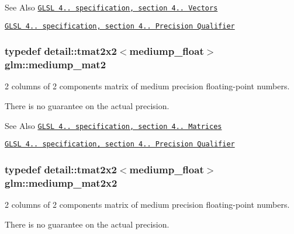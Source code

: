 \begin{DoxySeeAlso}{See Also}
\href{http://www.opengl.org/registry/doc/GLSLangSpec.4.20.8.pdf}{\tt G\-L\-S\-L 4.. specification, section 4.. Vectors} 

\href{http://www.opengl.org/registry/doc/GLSLangSpec.4.20.8.pdf}{\tt G\-L\-S\-L 4.. specification, section 4.. Precision Qualifier} 
\end{DoxySeeAlso}
\hypertarget{group__core__precision_gae67a4f24fb96b68e0f0346ef4212db61}{
\subsubsection[{mediump\-\_\-mat2}]{\setlength{\rightskip}{0pt plus 5cm}typedef detail\-::tmat2x2$<$mediump\-\_\-float$>$ {\bf glm\-::mediump\-\_\-mat2}}}\label{group__core__precision_gae67a4f24fb96b68e0f0346ef4212db61}


2 columns of 2 components matrix of medium precision floating-\/point numbers. 

There is no guarantee on the actual precision.

\begin{DoxySeeAlso}{See Also}
\href{http://www.opengl.org/registry/doc/GLSLangSpec.4.20.8.pdf}{\tt G\-L\-S\-L 4.. specification, section 4.. Matrices} 

\href{http://www.opengl.org/registry/doc/GLSLangSpec.4.20.8.pdf}{\tt G\-L\-S\-L 4.. specification, section 4.. Precision Qualifier} 
\end{DoxySeeAlso}
\hypertarget{group__core__precision_gaa78fd2384931c244700851141b8a47eb}{
\subsubsection[{mediump\-\_\-mat2x2}]{\setlength{\rightskip}{0pt plus 5cm}typedef detail\-::tmat2x2$<$mediump\-\_\-float$>$ {\bf glm\-::mediump\-\_\-mat2x2}}}\label{group__core__precision_gaa78fd2384931c244700851141b8a47eb}


2 columns of 2 components matrix of medium precision floating-\/point numbers. 

There is no guarantee on the actual precision.

